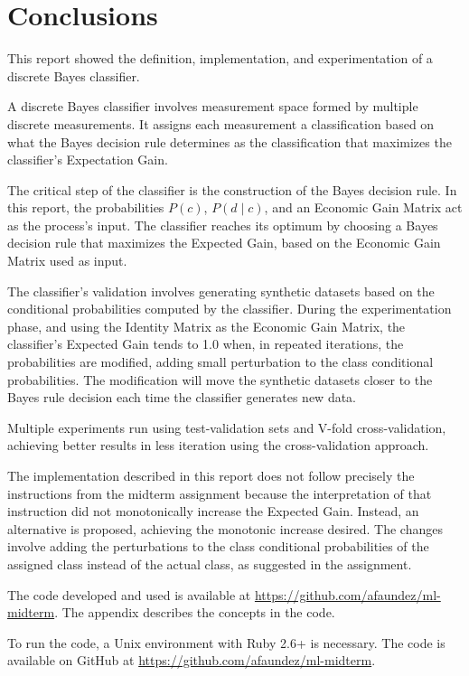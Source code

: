 \documentclass[letterpaper, conference]{IEEEtran}
\begin{document}
\section{Conclusions}


This report showed the definition, implementation, and experimentation of a discrete Bayes classifier.

A discrete Bayes classifier involves measurement space formed by multiple discrete measurements. It assigns each measurement a classification based on what the Bayes decision rule determines as the classification that maximizes the classifier's Expectation Gain.

The critical step of the classifier is the construction of the Bayes decision rule. In this report, the probabilities $P(c)$, $P(d \mid c)$, and an Economic Gain Matrix act as the process's input. The classifier reaches its optimum by choosing a Bayes decision rule that maximizes the Expected Gain, based on the Economic Gain Matrix used as input.

The classifier's validation involves generating synthetic datasets based on the conditional probabilities computed by the classifier. During the experimentation phase, and using the Identity Matrix as the Economic Gain Matrix, the classifier's Expected Gain tends to 1.0 when, in repeated iterations, the probabilities are modified, adding small perturbation to the class conditional probabilities. The modification will move the synthetic datasets closer to the Bayes rule decision each time the classifier generates new data.

Multiple experiments run using test-validation sets and V-fold cross-validation, achieving better results in less iteration using the cross-validation approach.

The implementation described in this report does not follow precisely the instructions from the midterm assignment because the interpretation of that instruction did not monotonically increase the Expected Gain. Instead, an alternative is proposed, achieving the monotonic increase desired. The changes involve adding the perturbations to the class conditional probabilities of the assigned class instead of the actual class, as suggested in the assignment.

The code developed and used is available at \url{https://github.com/afaundez/ml-midterm}. The appendix describes the concepts in the code.


\appendix


To run the code, a Unix environment with Ruby 2.6+ is necessary. The code is available on GitHub at \url{https://github.com/afaundez/ml-midterm}.
\end{document}
